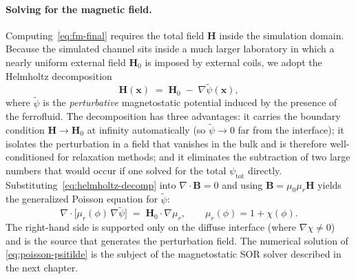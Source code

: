 \paragraph{Solving for the magnetic field.}
Computing~\eqref{eq:fm-final} requires the total field $\bm{H}$ inside the simulation domain.
Because the simulated channel sits inside a much larger laboratory in which a nearly uniform external field $\bm{H}_0$ is imposed by external coils, we adopt the Helmholtz decomposition
\begin{equation}
\bm{H}(\bm{x}) \;=\; \bm{H}_0 \;-\; \nabla\tilde{\psi}(\bm{x}),
\label{eq:helmholtz-decomp}
\end{equation}
where $\tilde{\psi}$ is the \emph{perturbative} magnetostatic potential induced by the presence of the ferrofluid.
The decomposition has three advantages: it carries the boundary condition $\bm{H}\to\bm{H}_0$ at infinity automatically (so $\tilde{\psi}\to 0$ far from the interface);
it isolates the perturbation in a field that vanishes in the bulk and is therefore well-conditioned for relaxation methods;
and it eliminates the subtraction of two large numbers that would occur if one solved for the total $\psi_{\mathrm{tot}}$ directly.
Substituting~\eqref{eq:helmholtz-decomp} into $\nabla\!\cdot\!\bm{B} = 0$ and using $\bm{B} = \mu_0\mu_r\bm{H}$ yields the generalized Poisson equation for $\tilde{\psi}$:
\begin{equation}
\boxed{\;\nabla\!\cdot\!\bigl[\mu_r(\phi)\,\nabla\tilde{\psi}\bigr]
\;=\; \bm{H}_0\!\cdot\!\nabla\mu_r,
\qquad \mu_r(\phi) = 1 + \chi(\phi).\;}
\label{eq:poisson-psitilde}
\end{equation}
The right-hand side is supported only on the diffuse interface (where $\nabla\chi \neq 0$) and is the source that generates the perturbation field.
The numerical solution of \eqref{eq:poisson-psitilde} is the subject of the magnetostatic SOR solver described in the next chapter.